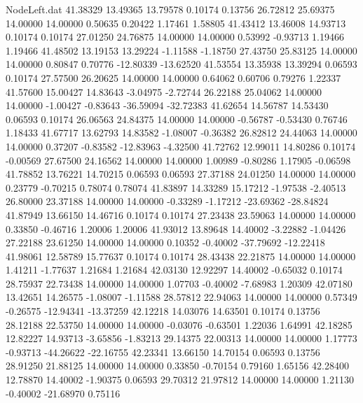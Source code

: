 \begin{filecontents}{NodeLeft.dat}
  41.38329   13.49365   13.79578     0.10174    0.13756   26.72812   25.69375   14.00000   14.00000    0.50635    0.20422    1.17461    1.58805
  41.43412   13.46008   14.93713     0.10174    0.10174   27.01250   24.76875   14.00000   14.00000    0.53992   -0.93713    1.19466    1.19466
  41.48502   13.19153   13.29224    -1.11588   -1.18750   27.43750   25.83125   14.00000   14.00000    0.80847    0.70776  -12.80339  -13.62520
  41.53554   13.35938   13.39294     0.06593    0.10174   27.57500   26.20625   14.00000   14.00000    0.64062    0.60706    0.79276    1.22337
  41.57600   15.00427   14.83643    -3.04975   -2.72744   26.22188   25.04062   14.00000   14.00000   -1.00427   -0.83643  -36.59094  -32.72383
  41.62654   14.56787   14.53430     0.06593    0.10174   26.06563   24.84375   14.00000   14.00000   -0.56787   -0.53430    0.76746    1.18433
  41.67717   13.62793   14.83582    -1.08007   -0.36382   26.82812   24.44063   14.00000   14.00000    0.37207   -0.83582  -12.83963   -4.32500
  41.72762   12.99011   14.80286     0.10174   -0.00569   27.67500   24.16562   14.00000   14.00000    1.00989   -0.80286    1.17905   -0.06598
  41.78852   13.76221   14.70215     0.06593    0.06593   27.37188   24.01250   14.00000   14.00000    0.23779   -0.70215    0.78074    0.78074
  41.83897   14.33289   15.17212    -1.97538   -2.40513   26.80000   23.37188   14.00000   14.00000   -0.33289   -1.17212  -23.69362  -28.84824
  41.87949   13.66150   14.46716     0.10174    0.10174   27.23438   23.59063   14.00000   14.00000    0.33850   -0.46716    1.20006    1.20006
  41.93012   13.89648   14.40002    -3.22882   -1.04426   27.22188   23.61250   14.00000   14.00000    0.10352   -0.40002  -37.79692  -12.22418
  41.98061   12.58789   15.77637     0.10174    0.10174   28.43438   22.21875   14.00000   14.00000    1.41211   -1.77637    1.21684    1.21684
  42.03130   12.92297   14.40002    -0.65032    0.10174   28.75937   22.73438   14.00000   14.00000    1.07703   -0.40002   -7.68983    1.20309
  42.07180   13.42651   14.26575    -1.08007   -1.11588   28.57812   22.94063   14.00000   14.00000    0.57349   -0.26575  -12.94341  -13.37259
  42.12218   14.03076   14.63501     0.10174    0.13756   28.12188   22.53750   14.00000   14.00000   -0.03076   -0.63501    1.22036    1.64991
  42.18285   12.82227   14.93713    -3.65856   -1.83213   29.14375   22.00313   14.00000   14.00000    1.17773   -0.93713  -44.26622  -22.16755
  42.23341   13.66150   14.70154     0.06593    0.13756   28.91250   21.88125   14.00000   14.00000    0.33850   -0.70154    0.79160    1.65156
  42.28400   12.78870   14.40002    -1.90375    0.06593   29.70312   21.97812   14.00000   14.00000    1.21130   -0.40002  -21.68970    0.75116

\end{filecontents}

